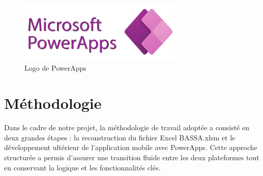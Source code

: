 \documentclass[a4paper, oneside, 12pt, final]{extreport}
\begin{document}
\begin{figure}[h]
    \centering
    \includegraphics[width=0.7\textwidth]{powerapps.png} %
    \caption{Logo de PowerApps}
    \label{fig:Logo de PowerApps}
\end{figure}
\section{Méthodologie}
Dans le cadre de notre projet, la méthodologie de travail adoptée a consisté en deux grandes étapes : la reconstruction du fichier Excel BASSA.xlsm et le développement ultérieur de l'application mobile avec PowerApps. Cette approche structurée a permis d'assurer une transition fluide entre les deux plateformes tout en conservant la logique et les fonctionnalités clés.
\end{document}
